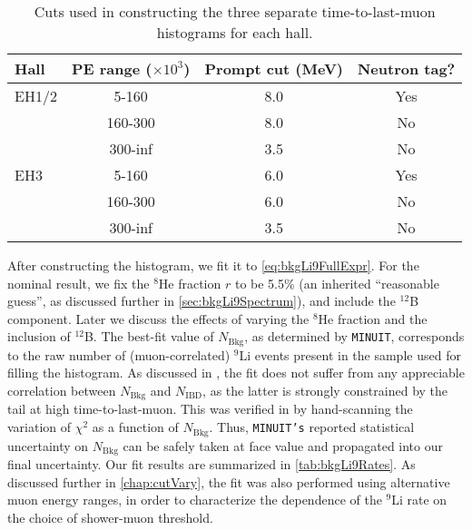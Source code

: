 \documentclass[../thesis.tex]{subfiles}
\begin{document}
\begin{table}[h]
  \centering
  \begin{tabular}{lccc}
    \toprule
    Hall & PE range ($\times10^3$) & Prompt cut (MeV) & Neutron tag? \\
    \midrule
    EH1/2  & 5-160   & 8.0 & Yes \\
           & 160-300 & 8.0 & No  \\
           & 300-inf & 3.5 & No  \\
    \midrule
    EH3  & 5-160   & 6.0 & Yes \\
         & 160-300 & 6.0 & No  \\
         & 300-inf & 3.5 & No  \\
    \bottomrule
  \end{tabular}
  \caption{Cuts used in constructing the three separate time-to-last-muon histograms for each hall.}
  \label{tab:bkgLi9Cuts}
\end{table}

After constructing the histogram, we fit it to \autoref{eq:bkgLi9FullExpr}. For the nominal result, we fix the $^8$He fraction $r$ to be 5.5\% (an inherited ``reasonable guess'', as discussed further in \autoref{sec:bkgLi9Spectrum}), and include the $^{12}$B component. Later we discuss the effects of varying the $^8$He fraction and the inclusion of $^{12}$B. The best-fit value of $N_{\mathrm{Bkg}}$, as determined by \texttt{MINUIT}, corresponds to the raw number of (muon-correlated) $^9$Li events present in the sample used for filling the histogram. As discussed in \cite{ChrisLi9}, the fit does not suffer from any appreciable correlation between $N_{\mathrm{Bkg}}$ and $N_{\mathrm{IBD}}$, as the latter is strongly constrained by the tail at high time-to-last-muon. This was verified in \cite{ChrisLi9} by hand-scanning the variation of $\chi^2$ as a function of $N_{\mathrm{Bkg}}$. Thus, \texttt{MINUIT's} reported statistical uncertainty on $N_{\mathrm{Bkg}}$ can be safely taken at face value and propagated into our final uncertainty. Our fit results are summarized in \autoref{tab:bkgLi9Rates}. As discussed further in \autoref{chap:cutVary}, the fit was also performed using alternative muon energy ranges, in order to characterize the dependence of the $^9$Li rate on the choice of shower-muon threshold.
\end{document}
